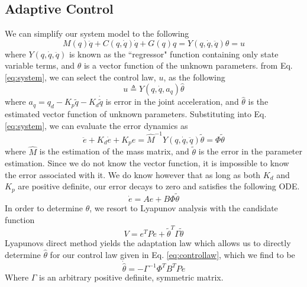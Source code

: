 \subsection*{Adaptive Control}
We can simplify our system model to the following
\begin{equation}
	M(q)\ddot{q} + C(q,\dot{q})\dot{q} + G(q)q = Y(q,\dot{q},\ddot{q})\theta = u
	\label{eq:system}
\end{equation}
where $Y(q,\dot{q},\ddot{q})$ is known as the ``regressor" function containing only state variable terms, and $\theta$ is a vector function of the unknown parameters. from Eq. \eqref{eq:system}, we can select the control law, $u$, as the following
\begin{equation}
	u \triangleq Y(q,\dot{q},a_{q})\hat{\theta}
	\label{eq:controllaw}
\end{equation}
where $a_{q}=q_{d} - K_{p}\tilde{q} - K_{d}\dot{\tilde{q}}$ is error in the joint acceleration, and $\hat{\theta}$ is the estimated vector function of unknown parameters. Substituting into Eq. \eqref{eq:system}, we can evaluate the error dynamics as
\begin{equation}
	\ddot{e} + K_{d}\dot{e} + K_{p}e = \hat{M}^{-1}Y(q,\dot{q},\ddot{q})\tilde{\theta} = \Phi\tilde{\theta}
\end{equation}
where $\hat{M}$ is the estimation of the mass matrix, and $\tilde{\theta}$ is the error in the parameter estimation. Since we do not know the vector function, it is impossible to know the error associated with it. We do know however that as long as both $K_{d}$ and $K_{p}$ are positive definite, our error decays to zero and satisfies the following ODE.
\begin{equation}
	\dot{e} = Ae + B\Phi\tilde{\theta}
\end{equation}
In order to determine $\theta$, we resort to Lyapunov analysis with the candidate function
\begin{equation}
	V = e^{T}Pe + \tilde{\theta}^{T}\Gamma\tilde{\theta}
\end{equation}
Lyapunovs direct method yields the adaptation law which allows us to directly determine $\hat{\theta}$ for our control law given in Eq. \eqref{eq:controllaw}, which we find to be
\begin{equation}
	\dot{\hat{\theta}} = -\Gamma^{-1}\Phi^{T}B^{T}Pe
	\label{eq:adaptLaw}
\end{equation}
Where $\Gamma$ is an arbitrary positive definite, symmetric matrix.
